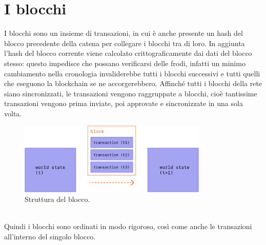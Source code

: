 \documentclass[a4paper,11pt]{report}
\begin{document}
\section{I blocchi}
I blocchi sono un insieme di transazioni, in cui è anche presente un hash del blocco precedente della catena per collegare i blocchi tra di loro. In aggiunta l'hash del blocco corrente viene calcolato crittograficamente dai dati del blocco stesso: questo impedisce che possano verificarsi delle frodi, infatti un minimo cambiamento nella cronologia invaliderebbe tutti i blocchi successivi e tutti quelli che eseguono la blockchain se ne accorgerebbero.
Affinché tutti i blocchi della rete siano sincronizzati, le transazioni vengono raggruppate a blocchi, cioè tantissime transazioni vengono prima inviate, poi approvate e sincronizzate in una sola volta.\\
\begin{figure}[htbp] 
\begin{center}
\includegraphics[width=9cm]{img/tx-block.png} 
\end{center}
\caption{Struttura del blocco.}
\end{figure}
\\Quindi i blocchi sono ordinati in modo rigoroso, così come anche le transazioni all'interno del singolo blocco.

\newpage
\end{document}
